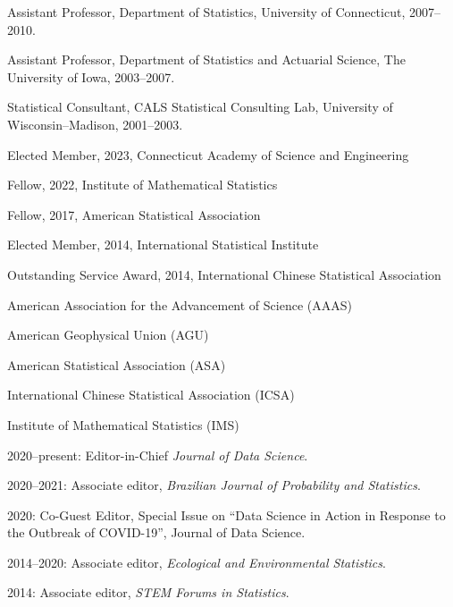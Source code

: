 \documentclass[Statistics]{vita}
\begin{document}
\begin{vita}
\begin{Positions}
  \item Assistant Professor, Department of Statistics, University of Connecticut, 2007--2010.
  \item Assistant Professor, Department of Statistics and Actuarial Science, The University of Iowa, 2003--2007.
  \item Statistical Consultant, CALS Statistical Consulting Lab, University of Wisconsin--Madison,  2001--2003. %
  \end{Positions}
  \begin{HonorsAndAwards}
  \item Elected Member, 2023, Connecticut Academy of Science and Engineering
  \item Fellow, 2022, Institute of Mathematical Statistics
  \item Fellow, 2017, American Statistical Association
  \item Elected Member, 2014, International Statistical Institute
  \item Outstanding Service Award, 2014, International Chinese Statistical Association
  \end{HonorsAndAwards}
  \begin{ProfessionalMemberships}
  \item American Association for the Advancement of Science (AAAS)
  \item American Geophysical Union (AGU) 
  \item American Statistical Association (ASA)
  \item International Chinese Statistical Association (ICSA)
  \item Institute of Mathematical Statistics (IMS)
  \end{ProfessionalMemberships}
  \begin{Services}
  \begin{Editorial}
  \item 2020--present: Editor-in-Chief \emph{Journal of Data Science}.
  \item 2020--2021: Associate editor, \emph{Brazilian Journal of Probability and Statistics}.
  \item 2020: Co-Guest Editor, Special Issue on ``Data Science in Action in Response to the Outbreak of COVID-19'', Journal of Data Science.
  \item 2014--2020: Associate editor,  \emph{Ecological and Environmental Statistics}.
  \item 2014: Associate editor, \emph{STEM Forums in Statistics}.

\end{Editorial}
\end{Services}
\end{vita}
\end{document}
